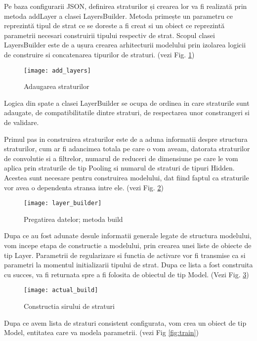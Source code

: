 	
	Pe baza configurarii JSON, definirea straturilor și crearea lor va fi realizată prin metoda addLayer a clasei LayersBuilder. Metoda primește un parametru ce reprezintă tipul de strat ce se doreste a fi creat si un obiect ce reprezintă parametrii necesari construirii tipului respectiv de strat. Scopul clasei LayersBuilder este de a ușura crearea arhitecturii modelului prin izolarea logicii de construire si concatenarea tipurilor de straturi. (vezi Fig. \ref{fig:add_layers})	
	
	\begin{figure}[H]
		\texttt{[image: add\_layers]}
		\caption{\label{fig:add_layers} Adaugarea straturilor}
	\end{figure}

	Logica din spate a clasei LayerBuilder se ocupa de ordinea in care straturile sunt adaugate, de  compatibilitatile dintre straturi, de respectarea unor constrangeri si de validare.
	
	Primul pas in construirea straturilor este de a aduna informatii despre structura straturilor, cum ar fi adancimea totala pe care o vom aveam, datorata straturilor de convolutie si a filtrelor,  numarul de reduceri de dimensiune pe care le vom aplica prin straturile de tip Pooling si numarul de straturi de tipuri Hidden. Acestea sunt necesare pentru construirea modelului, dat fiind faptul ca straturile vor avea o dependenta stransa intre ele.  (vezi Fig. \ref{fig:layer_builder})
	
	\begin{figure}[H]
		\texttt{[image: layer\_builder]}
		\caption{\label{fig:layer_builder} Pregatirea datelor; metoda build}
	\end{figure}
	

	Dupa ce au fost adunate desule informatii generale legate de structura modelului, vom incepe etapa de constructie a modelului, prin crearea unei liste de obiecte de tip Layer. Parametrii de regularizare si functia de activare vor fi transmise ca si parametri la momentul initializarii tipului de strat. Dupa ce lista a fost construita cu succes,  va fi returnata spre a fi folosita de obiectul de tip Model. (Vezi Fig. \ref{fig:actual_build})
	
	
	\begin{figure}[H]
		\texttt{[image: actual\_build]}
		\caption{\label{fig:actual_build} Constructia sirului de straturi}
	\end{figure}


	Dupa ce avem lista de straturi consistent configurata, vom crea un obiect de tip Model, entitatea care va modela parametrii. (vezi Fig \ref{fig:train})
	
